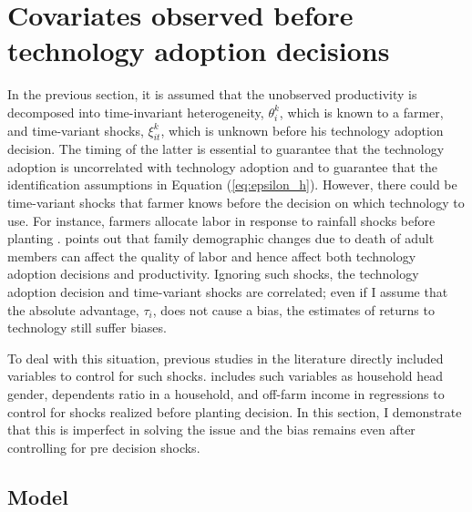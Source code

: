 \documentclass[11pt,letterpaper]{article}
\begin{document}
\section{Covariates observed before technology adoption decisions}\label{sec:covar}

In the previous section, it is assumed that the unobserved productivity is decomposed into time-invariant heterogeneity, $\theta_i^k$, which is known to a farmer, and time-variant shocks, $\xi_{it}^k$, which is unknown before his technology adoption decision.
The timing of the latter is essential to guarantee that the technology adoption is uncorrelated with technology adoption and to guarantee that the identification assumptions in Equation (\ref{eq:epsilon_h}).
However, there could be time-variant shocks that farmer knows before the decision on which technology to use.
For instance, farmers allocate labor in response to rainfall shocks before planting \citep{fafchamps1993sequential}.
\citet{Suri11} points out that family demographic changes due to death of adult members can affect the quality of labor and hence affect both technology adoption decisions and productivity.
Ignoring such shocks, the technology adoption decision and time-variant shocks are correlated; even if I assume that the absolute advantage, $\tau_i$, does not cause a bias, the estimates of returns to technology still suffer biases.

To deal with this situation, previous studies in the literature directly included variables to control for such shocks.
\citet{Michler2019} includes such variables as household head gender, dependents ratio in a household, and off-farm income in regressions to control for shocks realized before planting decision.
In this section, I demonstrate that this is imperfect in solving the issue and the bias remains even after controlling for pre decision shocks.

\subsection{Model}
\end{document}
